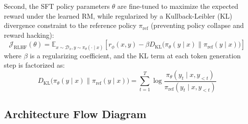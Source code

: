 Second, the SFT policy parameters $\theta$ are fine-tuned to maximize the expected reward under the learned RM, while regularized by a Kullback-Leibler (KL) divergence constraint to the reference policy $\pi_{\text{ref}}$ (preventing policy collapse and reward hacking):
\begin{equation}
  \mathcal{J}_{\text{RLHF}}(\theta) = \mathbb{E}_{x \sim \mathcal{D}_x, y \sim \pi_\theta(\cdot \mid x)} \left[ r_\phi(x, y) - \beta D_{\text{KL}}\bigl( \pi_\theta(y \mid x) \parallel \pi_{\text{ref}}(y \mid x) \bigr) \right]
\end{equation}
where $\beta$ is a regularizing coefficient, and the KL term at each token generation step is factorized as:
\begin{equation}
  D_{\text{KL}}\bigl( \pi_\theta(y \mid x) \parallel \pi_{\text{ref}}(y \mid x) \bigr) = \sum_{t=1}^T \log \frac{\pi_\theta(y_t \mid x, y_{<t})}{\pi_{\text{ref}}(y_t \mid x, y_{<t})}
\end{equation}

\subsection{Architecture Flow Diagram}

